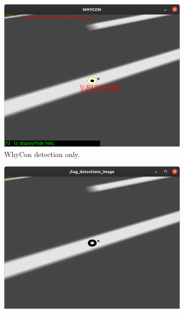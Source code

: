 
\begin{figure}
     \centering
     \begin{subfigure}[b]{0.49\textwidth}
         \centering
         \includegraphics[width=\textwidth]{images/whycon_detection_only.png}
         \caption{WhyCon detection only.}
         \label{subfig:whycon_detection_only}
     \end{subfigure}
     \hfill
     \begin{subfigure}[b]{0.49\textwidth}
         \centering
         \includegraphics[width=\textwidth]{images/no_apriltag.png}

\end{subfigure}
\end{figure}
